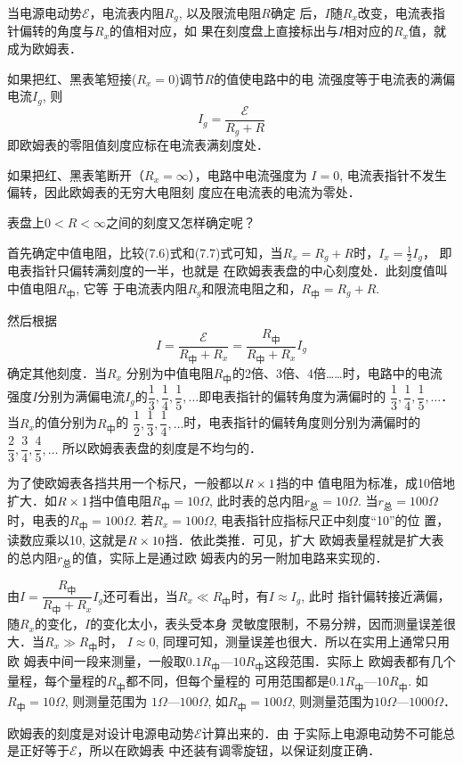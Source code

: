 当电源电动势$\mathcal{E}$，电流表内阻$R_g$, 以及限流电阻$R$确定
后，$I$随$R_x$改变，电流表指针偏转的角度与$R_x$的值相对应，如
果在刻度盘上直接标出与$I$相对应的$R_x$值，就成为欧姆表．

如果把红、黑表笔短接($R_x=0$)调节$R$的值使电路中的电
流强度等于电流表的满偏电流$I_g$, 则
\begin{equation}
    I_g=\frac{\mathcal{E}}{R_g+R}
\end{equation}
即欧姆表的零阻值刻度应标在电流表满刻度处．

如果把红、黑表笔断开（$R_x=\infty$），电路中电流强度为
$I=0$, 电流表指针不发生偏转，因此欧姆表的无穷大电阻刻
度应在电流表的电流为零处．

表盘上$0<R<\infty$之间的刻度又怎样确定呢？

首先确定中值电阻，比较(7.6)式和(7.7)式可知，当$R_x=R_g+R$时，$I_x=\frac{1}{2}I_g$，
即电表指针只偏转满刻度的一半，也就是
在欧姆表表盘的中心刻度处．此刻度值叫中值电阻$R_{\text{中}}$, 它等
于电流表内阻$R_g$和限流电阻之和，$R_{\text{中}}=R_g+R$.

然后根据
\[I=\frac{\mathcal{E}}{R_{\text{中}}+R_x}=\frac{R_{\text{中}}}{R_{\text{中}}+R_x}I_g\]
确定其他刻度．当$R_x$
分别为中值电阻$R_{\text{中}}$的2倍、3倍、4倍……时，电路中的电流
强度$I$分别为满偏电流$I_g$的$\dfrac{1}{3},\dfrac{1}{4},\dfrac{1}{5},\ldots$即电表指针的偏转角度为满偏时的
$\dfrac{1}{3},\dfrac{1}{4},\dfrac{1}{5},\ldots$．
当$R_x$的值分别为$R_{\text{中}}$的
$\dfrac{1}{2},\dfrac{1}{3},\dfrac{1}{4},\ldots$时，电表指针的偏转角度则分别为满偏时的$\dfrac{2}{3},\dfrac{3}{4},\dfrac{4}{5},\ldots$
所以欧姆表表盘的刻度是不均匀的．

为了使欧姆表各挡共用一个标尺，一般都以$R\times1$挡的中
值电阻为标准，成10倍地扩大．如$R\times1$挡中值电阻$R_{\text{中}}=
10\Omega$, 此时表的总内阻$r_{\text{总}}=10\Omega$. 当$r_{\text{总}}=100\Omega$时，电表的$R_{\text{中}}=
100\Omega$. 若$R_x=100\Omega$, 电表指针应指标尺正中刻度“10”的位
置，读数应乘以10, 这就是$R\times10$挡．依此类推．可见，扩大
欧姆表量程就是扩大表的总内阻$r_{\text{总}}$的值，实际上是通过欧
姆表内的另一附加电路来实现的．

由$I=\dfrac{R_{\text{中}}}{R_{\text{中}}+R_x}I_g$还可看出，当$R_x\ll R_{\text{中}}$时，有$I\approx I_g$, 此时
指针偏转接近满偏，随$R_x$的变化，$I$的变化太小，表头受本身
灵敏度限制，不易分辨，因而测量误差很大．当$R_x\gg R_{\text{中}}$时，
$I\approx 0$, 同理可知，测量误差也很大．所以在实用上通常只用欧
姆表中间一段来测量，一般取$0.1R_{\text{中}}$—$10R_{\text{中}}$这段范围．实际上
欧姆表都有几个量程，每个量程的$R_{\text{中}}$都不同，但每个量程的
可用范围都是$0.1R_{\text{中}}$—$10R_{\text{中}}$. 如$R_{\text{中}}=10\Omega$, 则测量范围为
$1\Omega$—$100\Omega$, 如$R_{\text{中}}=100\Omega$, 则测量范围为$10\Omega$—$1000\Omega$．

欧姆表的刻度是对设计电源电动势$\mathcal{E}$计算出来的．由
于实际上电源电动势不可能总是正好等于$\mathcal{E}$，所以在欧姆表
中还装有调零旋钮，以保证刻度正确．



